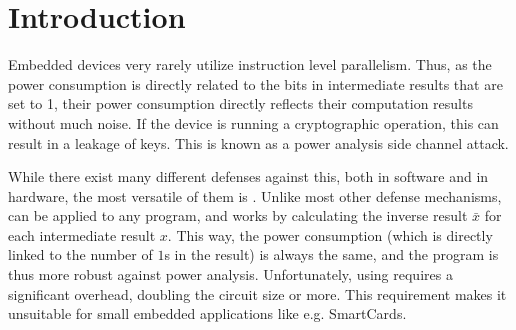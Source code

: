 \section{Introduction}
Embedded devices very rarely utilize instruction level parallelism.
Thus, as the power consumption is directly related to the bits in intermediate results that are set to 1, their power consumption directly reflects their computation results without much noise.
If the device is running a cryptographic operation, this can result in a leakage of keys.
This is known as a power analysis side channel attack\cite{kocher1999differential}.

While there exist many different defenses against this, both in software and in hardware, the most versatile of them is \dual{}\cite{sokolov2005design}.
Unlike most other defense mechanisms, \dual{} can be applied to any program, and works by calculating the inverse result $\bar{x}$ for each intermediate result $x$.
This way, the power consumption (which is directly linked to the number of $1$s in the result) is always the same, and the program is thus more robust against power analysis.
Unfortunately, using \dual{} requires a significant overhead, doubling the circuit size or more\cite{baddam2008path}.
This requirement makes it unsuitable for small embedded applications like e.g. SmartCards.
\\


